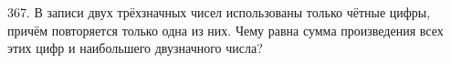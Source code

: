 367. В записи двух трёхзначных чисел использованы только чётные цифры, причём повторяется только одна из них. Чему равна сумма произведения всех этих цифр
и наибольшего двузначного числа?\\
